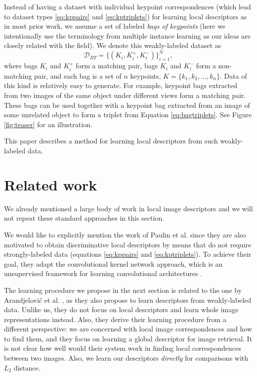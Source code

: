 \documentclass[10pt,conference,a4paper]{IEEEtran}
\begin{document}
		Instead of having a dataset with individual keypoint correspondences (which lead to dataset types \eqref{eq:kppairs} and \eqref{eq:kptriplets}) for learning local descriptors as in most prior work, we assume a set of labeled \emph{bags of keypoints}
		(here we intentionally use the terminology from multiple instance learning \cite{MIL} as our ideas are closely related with the field).
		We denote this weakly-labeled dataset as
		\begin{equation}\label{eq:bagtriplets}
			\mathcal{D}_{BT}=
			\{(K_{i}, K_i^+, K_i^-)\}_{i=1}^N
			,
		\end{equation}
		where bags $K_i$ and $K_i^+$ form a matching pair, bags $K_i$ and $K_i^-$ form a non-matching pair, and each bag is a set of $n$ keypoints, $K=\{k_1, k_2, \ldots, k_n\}$.
		Data of this kind is relatively easy to generate.
		For example, keypoint bags extracted from two images of the same object under different views form a matching pair.
		These bags can be used together with a keypoint bag extracted from an image of some unrelated object to form a triplet from Equation \eqref{eq:bagtriplets}.
		See Figure \ref{fig:teaser} for an illustration.
		
		This paper describes a method for learning local descriptors from such weakly-labeled data.

	\section{Related work}
		We already mentioned a large body of work in local image descriptors and we will not repeat these standard approaches in this section.

		We would like to explicitly mention the work of Paulin et al. \cite{kernelconv} since they are also motivated to obtain discriminative local descriptors by means that do not require strongly-labeled data (equations \eqref{eq:kppairs} and \eqref{eq:kptriplets}).
		To achieve their goal, they adapt the convolutional kernel network approach, which is an unsupervised framework for learning convolutional architectures \cite{kernelconv0}.

		The learning procedure we propose in the next section is related to the one by Arandjelovi\'{c} et al. \cite{netvlad}, as they also propose to learn descriptors from weakly-labeled data.
		Unlike us, they do not focus on local descriptors and learn whole image representations instead.
		Also, they derive their learning procedure from a different perspective: we are concerned with local image correspondences and how to find them, and they focus on learning a global descriptor for image retrieval.
		It is not clear how well would their system work in finding local correspondences between two images.
		Also, we learn our descriptors \textit{directly} for comparisons with $L_2$ distance.
\end{document}
